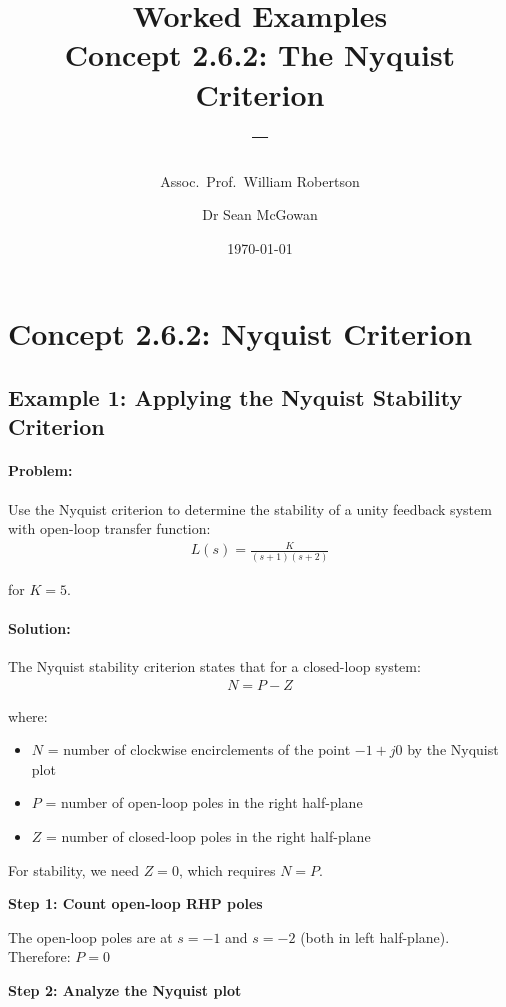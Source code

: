 \documentclass[11pt,a4paper]{article}
\title{\textbf{Worked Examples}\\[0.5em]
\large Concept 2.6.2: The Nyquist Criterion\\[0.3em]
\normalsize \coursesubtitle{} -- \coursetitle}
\author{Assoc.\ Prof.\ William Robertson \and Dr Sean McGowan}
\date{\today}
\begin{document}
\maketitle
\tableofcontents
\newpage

\section{Concept 2.6.2: Nyquist Criterion}

\subsection{Example 1: Applying the Nyquist Stability Criterion}

\paragraph{Problem:} Use the Nyquist criterion to determine the stability of a unity feedback system with open-loop transfer function:
\begin{align}
  L(s) = \frac{K}{(s+1)(s+2)}
\end{align}

for $K = 5$.

\paragraph{Solution:}

The Nyquist stability criterion states that for a closed-loop system:
\begin{align}
  N = P - Z
\end{align}

where:
\begin{itemize}
  \item $N$ = number of clockwise encirclements of the point $-1 + j0$ by the Nyquist plot
  \item $P$ = number of open-loop poles in the right half-plane
  \item $Z$ = number of closed-loop poles in the right half-plane
\end{itemize}

For stability, we need $Z = 0$, which requires $N = P$.

\textbf{Step 1: Count open-loop RHP poles}

The open-loop poles are at $s = -1$ and $s = -2$ (both in left half-plane).
Therefore: $P = 0$

\textbf{Step 2: Analyze the Nyquist plot}
\end{document}
